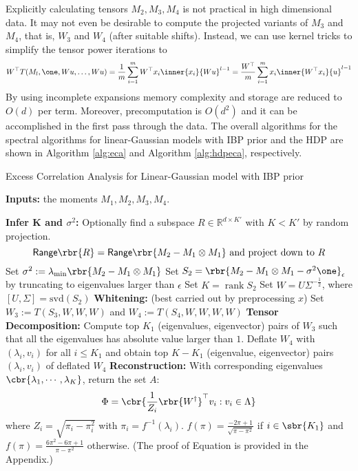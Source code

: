 \documentclass[twoside,11pt]{article}
\begin{document}
{  
%
Explicitly calculating tensors $M_2,M_3,M_4$ is not practical in high
dimensional data. It may not even be desirable to compute the
projected variants of $M_3$ and $M_4$, that is, $W_3$ and $W_4$ (after
suitable shifts). Instead, we can use kernel tricks to
simplify the tensor power iterations to
\begin{align}
  \nonumber
  W^\top T(M_l, \one, Wu, \ldots,  W u) 
  = \frac{1}{m} \sum_{i=1}^m {W^\top x_i} 
  \inner{ x_i}{W u}^{l-1}
  = \frac{W^\top}{m} \sum_{i=1}^m {x_i} 
  \inner{W^\top x_i}{u}^{l-1}
\end{align}
By using incomplete expansions memory complexity and storage are
reduced to $O(d)$ per term. Moreover, precomputation is $O(d^2)$ and
it can be accomplished in the first pass through the data.
The overall algorithms for the spectral algorithms for linear-Gaussian models with IBP 
prior and the HDP are shown in Algorithm \ref{alg:eca} and 
Algorithm \ref{alg:hdpeca}, respectively. 

\begin{algorithm}[t]
\caption{Excess Correlation Analysis for Linear-Gaussian model with IBP prior
      \label{alg:eca}}
\textbf{Inputs: } the moments $M_1, M_2, M_3, M_4$.
\begin{algorithmic}[1]
   \STATE \textbf{Infer K and $\sigma^2$:}  
   \STATE Optionally find a subspace $R \in \mathbb{R}^{d \times K'}$ with
   $K<K'$ by random projection.
   \[
     \mathsf{Range}\rbr{R} = \mathsf{Range}\rbr{M_2 - M_1 \otimes M_1}
     \text{ and project down to } R
     \]
   \STATE Set $\sigma^2 := \lambda_{\mathrm{min}} \rbr{M_2 - M_1 \otimes M_1}$
   \STATE Set $S_2 = \rbr{M_2 - M_1 \otimes M_1 - \sigma^2 \one}_\epsilon$
   by truncating to eigenvalues larger than $\epsilon$
   \STATE Set $K = \mathop{\mathrm{rank}} S_2$ 
   \STATE Set $W = U\Sigma^{-\frac{1}{2}}$, where $[U, \Sigma] = \mathrm{svd}(S_2)$
   \STATE \textbf{Whitening:} (best carried out by preprocessing $x$)
   \STATE Set $W_3 := T(S_3, W, W, W)$ and $W_4 := T(S_4, W, W,
   W, W)$
   \STATE \textbf{Tensor Decomposition: } 
   \STATE Compute top $K_1$ (eigenvalues, eigenvector) pairs of $W_3$ such that all the eigenvalues has absolute value larger than $1$.
   \STATE Deflate $W_4$ with $(\lambda_i, v_i)$ for all $i \leq K_1$ and obtain top $K - K_1$ (eigenvalue, eigenvector) pairs $(\lambda_i, v_i)$ of deflated $W_4$
   \STATE \textbf{Reconstruction: } With corresponding eigenvalues $\cbr{\lambda_1, \cdots, \lambda_K}$, return the set $A$: 
   \begin{align}
     \Phi= \cbr{\frac{1}{Z_i} \rbr{W^{\dag}}^\top v_i: v_i \in \Lambda} \label{eq:findA}
   \end{align}
     where $Z_i = \sqrt{\pi_i - \pi_i^2}$ with $\pi_i = f^{-1}(\lambda_i)$.  $f(\pi) = \frac{-2\pi+1}{\sqrt{\pi - \pi^2}} $ if $i \in \sbr{K_1}$ and $f(\pi)= \frac{6\pi^2-6\pi+1}{\pi-\pi^2} $ otherwise. (The proof of Equation  is provided in the Appendix.)
\end{algorithmic}
\end{algorithm}

}
\end{document}
